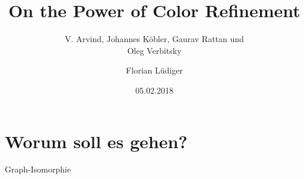 \documentclass{beamer}
\title{On the Power of Color Refinement}
\subtitle{V. Arvind, Johannes Köbler, Gaurav Rattan und\\ Oleg Verbitsky}
\date{05.02.2018}
\author{Florian Lüdiger}
\institute{Seminar Algorithm Engineering - Lehrstuhl 11 - TU Dortmund}
\begin{document}
	\maketitle
	\section{Worum soll es gehen?}
	\begin{frame}{Graph-Isomorphie}
	\end{frame}
\end{document}
